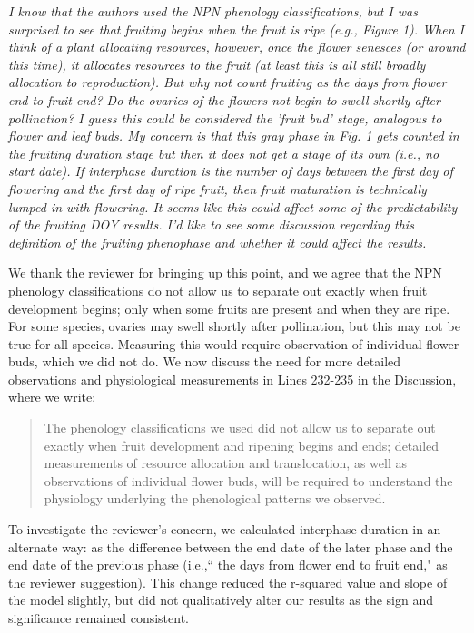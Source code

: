 \documentclass[10.95pt,a4paper]{letter}
\begin{document}
\par \emph{I know that the authors used the NPN phenology classifications, but I was surprised to see that fruiting begins when the fruit is ripe (e.g., Figure 1). When I think of a plant allocating resources, however, once the flower senesces (or around this time), it allocates resources to the fruit (at least this is all still broadly allocation to reproduction).  But why not count fruiting as the days from flower end to fruit end? Do the ovaries of the flowers not begin to swell shortly after pollination? I guess this could be considered the 'fruit bud' stage, analogous to flower and leaf buds.  My concern is that this gray phase in Fig. 1 gets counted in the fruiting duration stage but then it does not get a stage of its own (i.e., no start date). If interphase duration is the number of days between the first day of flowering and the first day of ripe fruit, then fruit maturation is technically lumped in with flowering. It seems like this could affect some of the predictability of the fruiting DOY results. I'd like to see some discussion regarding this definition of the fruiting phenophase and whether it could affect the results.}  
\par We thank the reviewer for bringing up this point, and we agree that the NPN phenology classifications do not allow us to separate out exactly when fruit development begins; only when some fruits are present and when they are ripe. For some species, ovaries may swell shortly after pollination, but this may not be true for all species. Measuring this would require observation of individual flower buds, which we did not do. We now discuss the need for more detailed observations and  physiological measurements in Lines 232-235 in the Discussion, where we write:
\begin{quote}
The phenology classifications we used did not allow us to separate out exactly when fruit development and ripening begins and ends; detailed measurements of resource allocation and translocation, as well as observations of individual flower buds, will be required to understand the physiology underlying the phenological patterns we observed.
\end{quote}
\par To investigate the reviewer's concern, we calculated interphase duration in an alternate way: as the difference between the end date of the later phase and the end date of the previous phase (i.e.,`` the days from flower end to fruit end," as the reviewer suggestion). This change reduced the r-squared value and slope of the model slightly, but did not qualitatively alter our results as the sign and significance remained consistent. 
\end{document}
